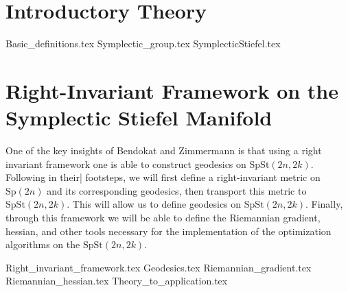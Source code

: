 \section{Introductory Theory}


{Basic_definitions.tex}
{Symplectic_group.tex}
{SymplecticStiefel.tex}

\section{Right-Invariant Framework on the \\Symplectic Stiefel Manifold}
One of the key insights of Bendokat and Zimmermann \cite[p.~11]{BendokatZimmermann2021} is that using a right invariant framework one is able to construct geodesics on $\mathrm{SpSt}(2n, 2k)$. Following in their| footsteps, we will first define a right-invariant metric on $\mathrm{Sp}(2n)$ and its corresponding geodesics, then transport this metric to $\mathrm{SpSt}(2n, 2k)$. This will allow us to define geodesics on $\mathrm{SpSt}(2n, 2k)$. Finally, through this framework we will be able to define the Riemannian gradient, hessian, and other tools necessary for the implementation of the optimization algorithms on the $\mathrm{SpSt}(2n, 2k)$. 

{Right_invariant_framework.tex}
{Geodesics.tex}
{Riemannian_gradient.tex}
{Riemannian_hessian.tex}
{Theory_to_application.tex}
